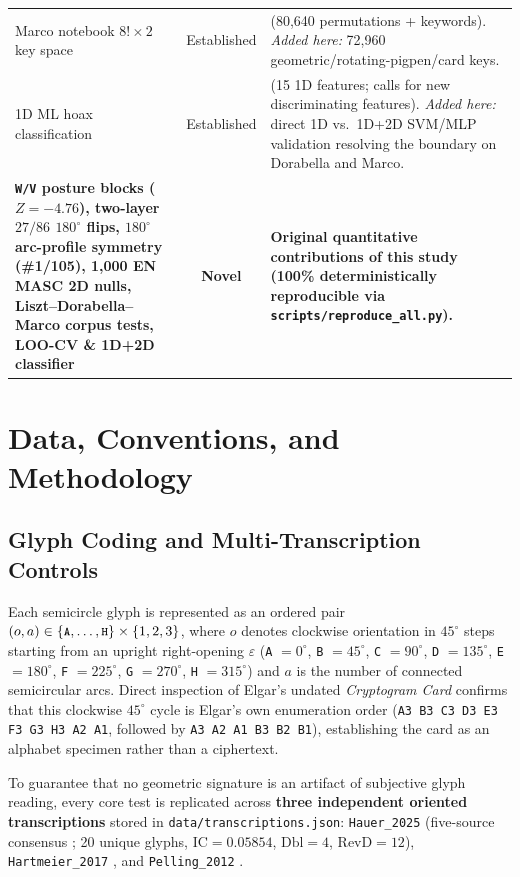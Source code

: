 \documentclass[10pt,a4paper,twocolumn]{article}
\newcommand{\code}[1]{\texttt{\small #1}}
\begin{document}
\begin{table}[t]
\begin{tabularx}{\textwidth}{@{}p{4.3cm} c X@{}}
Marco notebook $8!\times 2$ key space & Established & \citet{amreshra2024dorabellalab} (80,640 permutations + keywords). \emph{Added here:} 72,960 geometric/rotating-pigpen/card keys. \\
1D ML hoax classification & Established & \citet{foxon2024ann,foxon2025ml} (15 1D features; calls for new discriminating features). \emph{Added here:} direct 1D vs.\ 1D+2D SVM/MLP validation resolving the boundary on Dorabella and Marco. \\
\midrule
\textbf{\code{W/V} posture blocks ($Z=-4.76$), two-layer $27/86$ $180^\circ$ flips, $180^\circ$ arc-profile symmetry (\#1/105), 1,000 EN MASC 2D nulls, Liszt--Dorabella--Marco corpus tests, LOO-CV \& 1D+2D classifier} & \textbf{Novel} & \textbf{Original quantitative contributions of this study (100\% deterministically reproducible via \code{scripts/reproduce\_all.py}).} \\
\bottomrule
\end{tabularx}
\end{table}

\section{Data, Conventions, and Methodology}
\label{sec:methods}

\subsection{Glyph Coding and Multi-Transcription Controls}
Each semicircle glyph is represented as an ordered pair $(o, a) \in \{\code{A},\dots,\code{H}\}\times\{1,2,3\}$, where $o$ denotes clockwise orientation in $45^\circ$ steps starting from an upright right-opening $\varepsilon$ (\code{A} $= 0^\circ$, \code{B} $= 45^\circ$, \code{C} $= 90^\circ$, \code{D} $= 135^\circ$, \code{E} $= 180^\circ$, \code{F} $= 225^\circ$, \code{G} $= 270^\circ$, \code{H} $= 315^\circ$) and $a$ is the number of connected semicircular arcs. Direct inspection of Elgar's undated \emph{Cryptogram Card} \citep{bauer2017unsolved} confirms that this clockwise $45^\circ$ cycle is Elgar's own enumeration order (\code{A3 B3 C3 D3 E3 F3 G3 H3 A2 A1}, followed by \code{A3 A2 A1 B3 B2 B1}), establishing the card as an alphabet specimen rather than a ciphertext.

To guarantee that no geometric signature is an artifact of subjective glyph reading, every core test is replicated across \textbf{three independent oriented transcriptions} stored in \code{data/transcriptions.json}: \code{Hauer\_2025} (five-source consensus \citep{hauer2025dorabella}; 20 unique glyphs, $\mathrm{IC} = 0.05854$, $\mathrm{Dbl} = 4$, $\mathrm{RevD} = 12$), \code{Hartmeier\_2017} \citep{hartmeier2017dorabella}, and \code{Pelling\_2012} \citep{pelling2019dorabella}.
\end{document}
